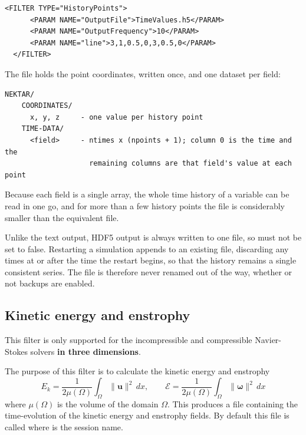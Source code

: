 \begin{lstlisting}[style=XMLStyle,gobble=2]
  <FILTER TYPE="HistoryPoints">
      <PARAM NAME="OutputFile">TimeValues.h5</PARAM>
      <PARAM NAME="OutputFrequency">10</PARAM>
      <PARAM NAME="line">3,1,0.5,0,3,0.5,0</PARAM>
  </FILTER>
\end{lstlisting}

The file holds the point coordinates, written once, and one dataset per field:

\begin{lstlisting}[gobble=2]
  NEKTAR/
    COORDINATES/
      x, y, z     - one value per history point
    TIME-DATA/
      <field>     - ntimes x (npoints + 1); column 0 is the time and the
                    remaining columns are that field's value at each point
\end{lstlisting}

Because each field is a single array, the whole time history of a variable can
be read in one go, and for more than a few history points the file is
considerably smaller than the equivalent  file.

Unlike the text output, HDF5 output is always written to one file, so
 must not be set to false. Restarting a simulation
appends to an existing file, discarding any times at or after the time the
restart begins, so that the history remains a single consistent series. The
file is therefore never renamed out of the way, whether or not backups are
enabled.

\subsection{Kinetic energy and enstrophy}\label{filters:Energy}

\begin{notebox}
  This filter is only supported for the incompressible and compressible
  Navier-Stokes solvers \textbf{in three dimensions}.
\end{notebox}

The purpose of this filter is to calculate the kinetic energy and enstrophy
%
\[
E_k = \frac{1}{2\mu(\Omega)}\int_{\Omega} \|\mathbf{u}\|^2\, dx, \qquad
\mathcal{E} = \frac{1}{2\mu(\Omega)}\int_{\Omega} \|\mathbf{\omega}\|^2\, dx
\]
%
where $\mu(\Omega)$ is the volume of the domain $\Omega$. This produces a file
containing the time-evolution of the kinetic energy and enstrophy fields. By
default this file is called  where  is the
session name.

